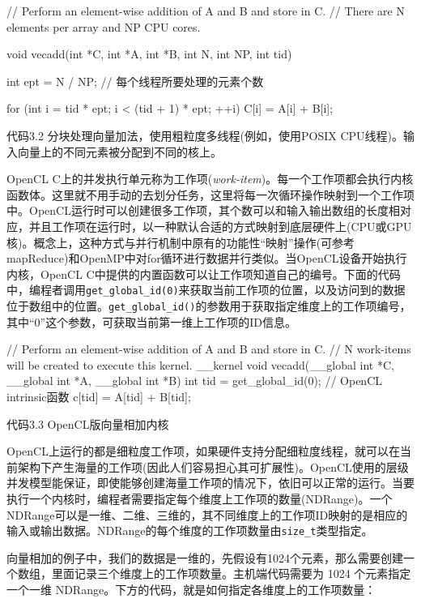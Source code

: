 \begin{codebox}[cpp]
// Perform an element-wise addition of A and B and store in C.
// There are N elements per array and NP CPU cores.

void vecadd(int *C, int *A, int *B, int N, int NP, int tid){

  int ept = N / NP; // 每个线程所要处理的元素个数

  for (int i = tid * ept; i < (tid + 1) * ept; ++i){
    C[i] = A[i] + B[i];
  }
}
\end{codebox}

代码3.2 分块处理向量加法，使用粗粒度多线程(例如，使用POSIX CPU线程)。输入向量上的不同元素被分配到不同的核上。

OpenCL C上的并发执行单元称为工作项(\emph{work-item})。每一个工作项都会执行内核函数体。这里就不用手动的去划分任务，这里将每一次循环操作映射到一个工作项中。OpenCL运行时可以创建很多工作项，其个数可以和输入输出数组的长度相对应，并且工作项在运行时，以一种默认合适的方式映射到底层硬件上(CPU或GPU核)。概念上，这种方式与并行机制中原有的功能性“映射”操作(可参考mapReduce)和OpenMP中对for循环进行数据并行类似。当OpenCL设备开始执行内核，OpenCL C中提供的内置函数可以让工作项知道自己的编号。下面的代码中，编程者调用\texttt{get\_global\_id(0)}来获取当前工作项的位置，以及访问到的数据位于数组中的位置。\texttt{get\_global\_id()}的参数用于获取指定维度上的工作项编号，其中“0”这个参数，可获取当前第一维上工作项的ID信息。

\begin{codebox}[cpp]
// Perform an element-wise addition of A and B and store in C.
// N work-items will be created to execute this kernel.
__kernel
void vecadd(__global int *C, __global int *A, __global int *B){
  int tid = get_global_id(0); // OpenCL intrinsic函数
  c[tid] = A[tid] + B[tid];
}
\end{codebox}

代码3.3 OpenCL版向量相加内核

OpenCL上运行的都是细粒度工作项，如果硬件支持分配细粒度线程，就可以在当前架构下产生海量的工作项(因此人们容易担心其可扩展性)。OpenCL使用的层级并发模型能保证，即使能够创建海量工作项的情况下，依旧可以正常的运行。当要执行一个内核时，编程者需要指定每个维度上工作项的数量(NDRange)。一个NDRange可以是一维、二维、三维的，其不同维度上的工作项ID映射的是相应的输入或输出数据。NDRange的每个维度的工作项数量由\texttt{size\_t}类型指定。

向量相加的例子中，我们的数据是一维的，先假设有1024个元素，那么需要创建一个数组，里面记录三个维度上的工作项数量。主机端代码需要为 1024 个元素指定一个一维 NDRange。下方的代码，就是如何指定各维度上的工作项数量：

